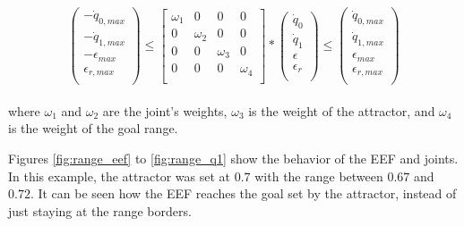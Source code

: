 $$
\left( \begin{array}{c}
-\dot{q}_{0,max} \\
-\dot{q}_{1,max} \\
-\epsilon_{max} \\
\epsilon_{r,max} \\
\end{array}
\right)	\leq 
\left[ \begin{array}{cccc}
\omega_{1} & 0 & 0 & 0 \\
0 & \omega_{2} & 0 & 0 \\
0 & 0 & \omega_{3} & 0 \\
0 & 0 & 0 & \omega_{4} \\
\end{array}
\right] *
\left( \begin{array}{c}
\dot{q}_{0} \\
\dot{q}_{1} \\
\epsilon \\
\epsilon_r \\
\end{array}
\right) 
\leq \left( \begin{array}{c}
\dot{q}_{0,max} \\
\dot{q}_{1,max} \\
\epsilon_{max} \\
\epsilon_{r,max} \\
\end{array}
\right)
$$
\\
where $\omega_{1}$ and $\omega_{2}$ are the joint's weights, $\omega_{3}$ is the weight of the attractor, and $\omega_{4}$ is the weight of the goal range.
 
Figures \ref{fig:range_eef} to \ref{fig:range_q1} show the behavior of the EEF and joints. In this example, the attractor was set at $0.7$ with the range between $0.67$ and $0.72$. It can be seen how the EEF reaches the goal set by the attractor, instead of just staying at the range borders. 


